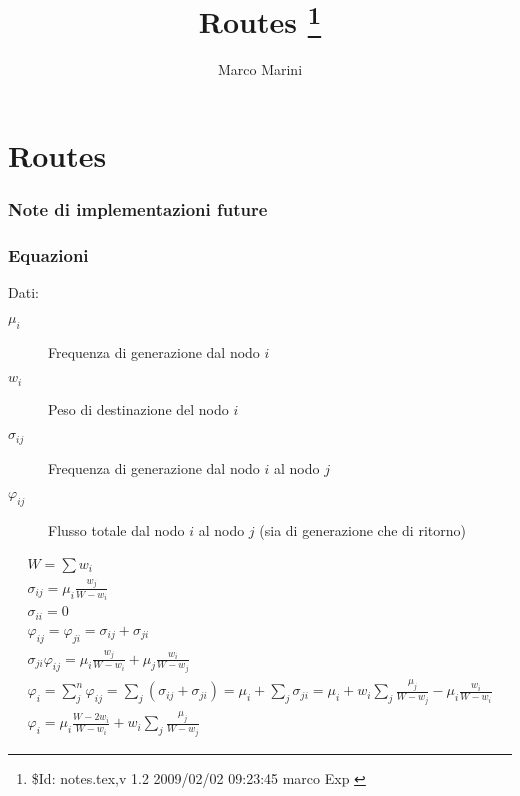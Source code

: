 \documentclass[a4paper,twoside]{article}
\begin{document}
  \title{
    Routes \footnote{
      \$Id: notes.tex,v 1.2 2009/02/02 09:23:45 marco Exp $$
    }
  }
  \author{Marco Marini}
  \maketitle
  \tableofcontents
  \part{Routes}
  \section{Note di implementazioni future}
  \section{Equazioni}
  Dati:
  
  \begin{description}
  \item[$\mu_i$]
    Frequenza di generazione dal nodo $i$
  \item[$w_i$]
    Peso di destinazione del nodo $i$
  \item[$\sigma_{ij}$]
    Frequenza di generazione dal nodo $i$ al nodo $j$
  \item[$\varphi_{ij}$]
    Flusso totale dal nodo $i$ al nodo $j$ (sia di generazione che di ritorno)
  \end{description}

  \begin{eqnarray}
    W=\sum w_i
    \\
    \sigma_{ij}=\mu_i\frac{w_j}{W-w_i}
    \\
    \sigma_{ii}=0
    \\
    \varphi_{ij}=\varphi_{ji}=\sigma_{ij}+\sigma_{ji}
    \\\sigma_{ji}
    \varphi_{ij}=\mu_i\frac{w_j}{W-w_i}+\mu_j\frac{w_i}{W-w_j}
    \\
    \varphi_i=\sum_j^n \varphi_{ij}=\sum_j(\sigma_{ij}+\sigma_{ji})
    = \mu_i+\sum_j{\sigma_{ji}}
    = \mu_i+w_i\sum_j{\frac{\mu_j}{W-w_j}}-\mu_i\frac{w_i}{W-w_i}
    \\
    \varphi_i= \mu_i\frac{W-2 w_i}{W-w_i}+w_i\sum_j{\frac{\mu_j}{W-w_j}}
  \end{eqnarray}
\end{document}
